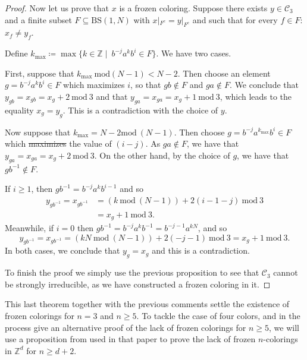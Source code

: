 \documentclass[cupthm,crop,info]{CUP-JNL-ETS}%
\theoremstyle{cupplain}
\theoremstyle{cupdefinition}
\theoremstyle{cupremark}
\theoremstyle{cupproof}
\newtheorem{proof}{Proof}
\numberwithin{equation}{section}
\newcommand{\BS}[1][N]{\mathrm{BS}(1,#1)}
\providecommand{\DIFadd}[1]{{\protect\color{blue}\uwave{#1}}} %
\providecommand{\DIFdel}[1]{{\protect\color{red}\sout{#1}}}                      %
\providecommand{\DIFaddbegin}{} %
\providecommand{\DIFaddend}{} %
\providecommand{\DIFdelbegin}{} %
\providecommand{\DIFdelend}{} %
\newcommand{\DIFscaledelfig}{0.5}
\newlength{\DIFdelgraphicswidth} %
\newlength{\DIFdelgraphicsheight} %
\newcommand{\DIFaddincludegraphics}[2][]{{\color{blue}\fbox{\DIFOincludegraphics[#1]{#2}}}} %
\newcommand{\DIFdelincludegraphics}[2][]{%
\sbox{\DIFdelgraphicsbox}{\DIFOincludegraphics[#1]{#2}}%
\settoboxwidth{\DIFdelgraphicswidth}{\DIFdelgraphicsbox} %
\settoboxtotalheight{\DIFdelgraphicsheight}{\DIFdelgraphicsbox} %
\scalebox{\DIFscaledelfig}{%
\parbox[b]{\DIFdelgraphicswidth}{\usebox{\DIFdelgraphicsbox}\\[-\baselineskip] \rule{\DIFdelgraphicswidth}{0em}}\llap{\resizebox{\DIFdelgraphicswidth}{\DIFdelgraphicsheight}{%
\setlength{\unitlength}{\DIFdelgraphicswidth}%
\begin{picture}(1,1)%
\thicklines\linethickness{2pt} %
{\color[rgb]{1,0,0}\put(0,0){\framebox(1,1){}}}%
{\color[rgb]{1,0,0}\put(0,0){\line( 1,1){1}}}%
{\color[rgb]{1,0,0}\put(0,1){\line(1,-1){1}}}%
\end{picture}%
}\hspace*{3pt}}} %
} %
\DeclareRobustCommand{\DIFaddbegin}{\DIFOaddbegin \let\includegraphics\DIFaddincludegraphics} %
\DeclareRobustCommand{\DIFaddend}{\DIFOaddend \let\includegraphics\DIFOincludegraphics} %
\DeclareRobustCommand{\DIFdelbegin}{\DIFOdelbegin \let\includegraphics\DIFdelincludegraphics} %
\DeclareRobustCommand{\DIFdelend}{\DIFOaddend \let\includegraphics\DIFOincludegraphics} %
\begin{document}
\begin{proof}
Now let us prove that $x$ is a frozen coloring. Suppose there exists $y\in \mathcal{C}_3$ and a finite subset $F\subseteq\BS$ with $x|_{F^{c}}=y|_{F^c}$ and such that for every $f\in F$: $x_f\neq y_f$.

Define $k_{\mathrm{max}}\coloneqq \max\{k\in \mathbb{Z}\mid \ b^{-j}a^kb^i\in F \}$. We have two cases.

First, suppose that $k_{\mathrm{max}} \ \mathrm{mod} (N-1)<N-2$. Then choose an element $g=b^{-j}a^kb^i\in F$ which maximizes $i$, so that $gb\notin F$ and $ga\notin F$. We conclude that $y_{gb}=x_{gb}=x_g+2\ \mathrm{mod}\ 3$ and that $y_{ga}=x_{ga}=x_g+1\ \mathrm{mod}\ 3$, which leads to the  equality $x_g=y_g$. This is a contradiction with the choice of $y$.

Now suppose that \DIFdelbegin \DIFdel{$k_{\mathrm{max}}=N-2\mathrm{mod}\ (N-1)$}\DIFdelend \DIFaddbegin \DIFadd{$k_{\mathrm{max}}=N-2\ \mathrm{mod}\ (N-1)$}\DIFaddend . Then choose $g=b^{-j}a^{k_{\mathrm{max}}}b^i\in F$ which \DIFdelbegin \DIFdel{maximizes }\DIFdelend \DIFaddbegin \DIFadd{minimizes }\DIFaddend the value of $(i-j)$. As $ga\notin F$, we have that $y_{ga}=x_{ga}=x_g+2\ \mathrm{mod}\ 3$. On the other hand, by the choice of $g$, we have that $gb^{-1}\notin F$.

If $i\ge 1$, then $gb^{-1}=b^{-j}a^kb^{i-1}$ and so
\begin{align*}
y_{gb^{-1}}=x_{gb^{-1}}&=(k\ \mathrm{mod}\ (N-1))+2(i-1-j)\ \mathrm{mod}\ 3\\
&=x_g+1\ \mathrm{mod}\ 3.
\end{align*}
Meanwhile, if $i=0$ then $gb^{-1}=b^{-j}a^kb^{-1}=b^{-j-1}a^{kN}$, and so
$$
y_{gb^{-1}}=x_{gb^{-1}}=(kN \ \mathrm{mod}\ (N-1))+2(-j-1)\ \mathrm{mod}\ 3=x_{g}+1\ \mathrm{mod}\ 3.
$$
	In both cases, we conclude that $y_g=x_g$ and this is a contradiction.


	To finish the proof we simply use the previous proposition to see that $\mathcal{C}_3$ cannot be strongly irreducible, as we have constructed a frozen coloring in it.
\end{proof}

This last theorem together with the previous comments settle the existence of frozen colorings for $n=3$ and $n\ge 5$. To tackle the case of four colors, and in the process give an alternative proof of the lack of frozen colorings for $n\ge 5$, we will use a proposition from \cite{alon2019mixing} used in that paper to prove the lack of frozen $n$-colorings in $\mathbb{Z}^d$ for $n\ge d+2$.
\end{document}
